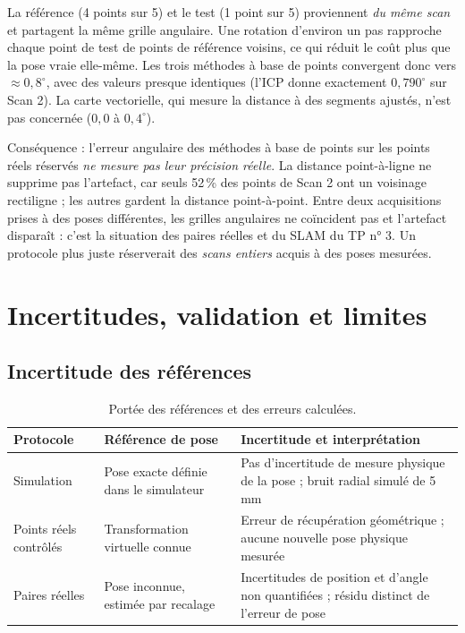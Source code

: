 \documentclass[11pt,a4paper]{article}
\begin{document}
La référence (4 points sur 5) et le test (1 point sur 5) proviennent
\emph{du même scan} et partagent la même grille angulaire. Une rotation
d'environ un pas rapproche chaque point de test de points de référence
voisins, ce qui réduit le coût plus que la pose vraie elle-même. Les trois
méthodes à base de points convergent donc vers $\approx0{,}8^\circ$, avec des
valeurs presque identiques (l'ICP donne exactement $0{,}790^\circ$ sur Scan 2).
La carte vectorielle, qui mesure la distance à des segments ajustés,
n'est pas concernée ($0{,}0$ à $0{,}4^\circ$).

Conséquence : l'erreur angulaire des méthodes à base de points sur les
points réels réservés \emph{ne mesure pas leur précision réelle}. La distance
point-à-ligne ne supprime pas l'artefact, car seuls 52\,\% des points de
Scan 2 ont un voisinage rectiligne ; les autres gardent la distance
point-à-point. Entre deux acquisitions prises à des poses différentes,
les grilles angulaires ne coïncident pas et l'artefact disparaît :
c'est la situation des paires réelles et du SLAM du TP n° 3. Un protocole
plus juste réserverait des \emph{scans entiers} acquis à des poses mesurées.

\section{Incertitudes, validation et limites}
\subsection{Incertitude des références}
\begin{table}[htbp]
\centering
\caption{Portée des références et des erreurs calculées.}
\begin{tabularx}{\linewidth}{l>{\raggedright\arraybackslash}X>{\raggedright\arraybackslash}X}
\toprule
Protocole & Référence de pose & Incertitude et interprétation \\
\midrule
Simulation & Pose exacte définie dans le simulateur &
Pas d'incertitude de mesure physique de la pose ; bruit radial simulé de 5 mm \\
Points réels contrôlés & Transformation virtuelle connue &
Erreur de récupération géométrique ; aucune nouvelle pose physique mesurée \\
Paires réelles & Pose inconnue, estimée par recalage &
Incertitudes de position et d'angle non quantifiées ; résidu distinct de l'erreur de pose \\
\bottomrule
\end{tabularx}
\end{table}
\end{document}
